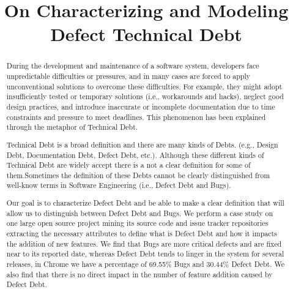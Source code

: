 \documentclass[conference]{IEEEtran}
\begin{document}
\title{On Characterizing and Modeling Defect Technical Debt}

\author{

}

\maketitle

\begin{abstract}
During the development and maintenance of a software system, developers face unpredictable difficulties or pressures, and in many cases are forced to apply unconventional solutions to overcome these difficulties. For example, they might adopt insufficiently tested or temporary solutions (i.e., workarounds and hacks), neglect good design practices, and introduce inaccurate or incomplete documentation
due to time constraints and pressure to meet deadlines. This phenomenon has been explained through the metaphor of Technical Debt.

Technical Debt is a broad definition and there are many kinds of Debts. (e.g., Design Debt, Documentation Debt, Defect Debt, etc.). Although these different kinds of Technical Debt are widely accept there is a not a clear definition for some of them.Sometimes the definition of these Debts cannot be clearly distinguished from well-know terms in Software Engineering (i.e., Defect Debt and Bugs). 

Our goal is to characterize Defect Debt and be able to make a clear definition that will allow us to distinguish between Defect Debt and Bugs. We perform a case study on one large open source project mining its source code and issue tracker repositories extracting the necessary attributes to define what is Defect Debt and how it impacts the addition of new features. We find that Bugs are more critical defects and are fixed near to its reported date, whereas Defect Debt tends to linger in the system for several releases, in Chrome we have a percentage of 69.55\%  Bugs and 30.44\% Defect Debt. We also find that there is no direct impact in the number of feature addition caused by Defect Debt.
  
\end{abstract}

\IEEEpeerreviewmaketitle
\end{document}
